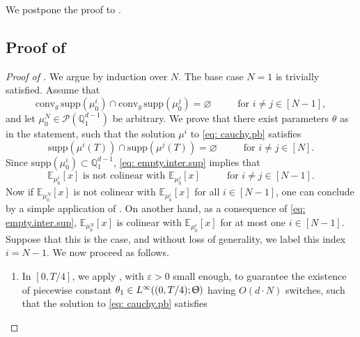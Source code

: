 \documentclass[a4paper,11pt]{article}
\theoremstyle{plain}
\newcommand{\supp}{\mathrm{supp}}
\newcommand{\conv}{\mathrm{conv}}
\newcommand{\Q}{\mathbb{Q}}
\numberwithin{equation}{section}
\begin{document}
We postpone the proof to {\bf{}}.






\subsection{\texorpdfstring{Proof of }{Proof of Proposition}} \label{sec: proof.prop.separation}


\begin{proof}[Proof of ]

We argue by induction over $N$. The base case $N=1$ is trivially satisfied. Assume that 
\begin{equation}\label{eq: empty.inter.sup}
\conv_g\,\supp(\mu^i_0)\cap\conv_g\,\supp(\mu^j_0)=\varnothing \hspace{1cm} \text{ for } i\neq j\in[N-1],
\end{equation}
and let $\mu_0^N\in \mathscr{P}(\Q_1^{d-1})$ be arbitrary. 
We prove that there exist parameters $\theta$ as in the statement, such that the solution $\mu^i$ to \eqref{eq: cauchy.pb} satisfies
\begin{equation*}
\supp(\mu^i(T))\cap\supp(\mu^j(T))=\varnothing\hspace{1cm} \text{ for } i\neq j\in[N].
\end{equation*}
Since $\supp(\mu^i_0)\subset\Q_1^{d-1}$, \eqref{eq: empty.inter.sup} implies that
\begin{equation*}
    \mathbb{E}_{\mu^i_0}[x]\text{ is not colinear with }\mathbb{E}_{\mu^j_0}[x] \hspace{1cm} \text{ for } i\neq j\in[N-1].
\end{equation*}
Now if $\mathbb{E}_{\mu_0^N}[x]$ is not colinear with $\mathbb{E}_{\mu_0^i}[x]$ for all $i\in[N-1]$, one can conclude by a simple application of . 
On another hand, as a consequence of \eqref{eq: empty.inter.sup}, $\mathbb{E}_{\mu^N_0}[x]$ is colinear with $\mathbb{E}_{\mu^i_0}[x]$ for at most one $i\in[N-1]$. 
Suppose that this is the case, and without loss of generality, we label this index $i=N-1$. We now proceed as follows.
\begin{enumerate}
    \item In $\left[0,T/4\right]$, we apply , with $\varepsilon>0$ small enough, to guarantee the existence of piecewise constant $\theta_1\in L^\infty((0,T/4); \Uptheta)$ having $O(d\cdot N)$ switches, such that the solution to \eqref{eq: cauchy.pb} satisfies

\end{enumerate}
\end{proof}
\end{document}
